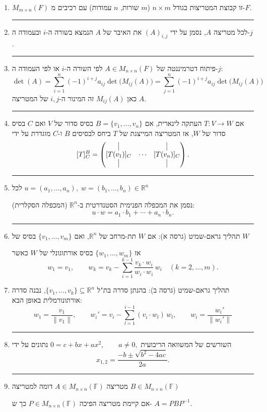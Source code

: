 \documentclass[12pt, a4paper]{article}
\newcommand{\ff}{\mathbb{F}}
\newcommand{\rr}{\mathbb{R}}
\begin{document}
\begin{enumerate}
\item $M_{m\times n}(F)$ זו קבוצת המטריצות בגודל $n\times m$
($m$ שורות, $n$ עמודות)
עם רכיבים מ-$F$.

\noindent\rule{\textwidth-30pt}{0.4pt}

\item לכל מטריצה $A$, נסמן על ידי $(A)_{i,j}$ את האיבר של $A$ הנמצא בשורה ה-$i$ ובעמודה ה-$j$.

\noindent\rule{\textwidth-30pt}{0.4pt}

\item פיתוח דטרמיננטה של $A\in M_{n\times n}(F)$ לפי השורה ה-$i$ או לפי העמודה ה-$j$:
\[
\det(A)=\sum_{i=1}^{n}(-1)^{i+j}a_{ij}\det\!\big(M_{ij}(A)\big)
=\sum_{j=1}^{n}(-1)^{i+j}a_{ij}\det\!\big(M_{ij}(A)\big)
\]
כאן $M_{ij}(A)$ זה המינור ה-$i,j$ של המטריצה $A$.

\noindent\rule{\textwidth-30pt}{0.4pt}

\item אם $T:V\to W$ העתקה לינארית, אם $B=\{v_1,\ldots,v_n\}$ בסיס סדור של $V$ ואם $C$ בסיס סדור של $W$,
אז המטריצה המייצגת של $T$ ביחס לבסיסים $B$ ו-$C$ מוגדרת על ידי
\[
[T]^B_C=
\begin{pmatrix}
\vline & & \vline\\
[T(v_1)]_C & \cdots & [T(v_n)]_C\\
\vline & & \vline
\end{pmatrix}.
\]

\noindent\rule{\textwidth-30pt}{0.4pt}

\item לכל $u=(a_1,\ldots,a_n),\; w=(b_1,\ldots,b_n)\in\mathbb{R}^n$

נסמן את המכפלה הפנימית הסטנדרטית ב-$\mathbb{R}^n$ (המכפלה הסקלרית):
\[
 u\cdot w=a_1\cdot b_1+\cdots+a_n\cdot b_n.
\]

\noindent\rule{\textwidth-30pt}{0.4pt}



\item תהליך גראם-שמיט (גרסה א):
אם $W$ תת-מרחב של $\rr^n$, ואם $\{v_1,\ldots,v_m\}$ בסיס של $W$

אז $\{w_1,\ldots,w_m\}$ בסיס אורתוגונלי של $W$ כאשר
\[
w_1=v_1,\qquad
w_k=v_k-\sum_{i=1}^{k-1}\frac{ v_k\cdot w_i}{ w_i\cdot w_i}\,w_i
\quad (k=2,\ldots,m).
\]
\item תהליך גראם-שמיט (גרסה ב):
בהנתן סדרה בת"ל
$\{v_1,\ldots,v_k\}\subseteq \rr^n$, נבנה סדרה אורתונורמלית באופן הבא:
\[
w_1=\frac{v_1}{\|v_1\|},\qquad
w_i'=v_i-\sum_{l=1}^{i-1} (v_i\cdot w_l)\,w_l,\qquad w_i = \frac{w_i'}{\|w_i'\|}
\]

\noindent\rule{\textwidth-30pt}{0.4pt}

\item השורשים של המשוואה הריבועית
$
0=c+bx+ax^2,\qquad a\ne 0,
$
נתונים על ידי
\[
x_{1,2}=\frac{-b\pm\sqrt{b^2-4ac}}{2a}.
\]

\noindent\rule{\textwidth-30pt}{0.4pt}

\item מטריצה $A\in M_{n\times n}(\ff)$ דומה למטריצה $B\in M_{n\times n}(\ff)$ 

אם
קיימת 
מטריצה הפיכה
$P\in M_{n\times n}(\ff)$ כך ש-
$A=PBP^{-1}$.
\end{enumerate}
\end{document}
